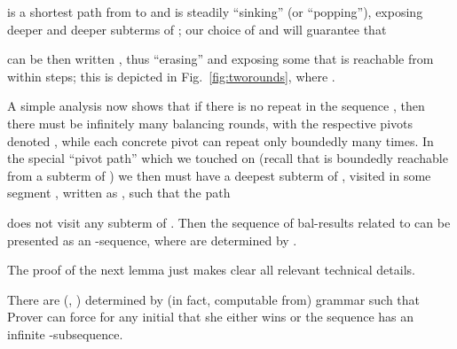 \documentclass{llncs}
\begin{document}
is a shortest path from  to  and
is steadily ``sinking'' (or
``popping''), exposing deeper and deeper subterms of ; 
our choice of  and  will guarantee that
 
can be then written , 
thus ``erasing''  
and exposing some
 that is reachable from  within  steps;
this is depicted in Fig.~\ref{fig:tworounds}, where
.

A simple analysis now shows that
if there is no repeat in the sequence 
, then
there must be infinitely many balancing rounds, with the respective 
pivots denoted 
, 
while each concrete pivot can 
repeat only boundedly many times.
In the special ``pivot path''  which we
touched on (recall 
that  is boundedly reachable from a subterm of )
we then must have a deepest subterm  of ,
visited in some segment 
, written as 
,
such that the path 

does not visit any subterm of .
Then the sequence of
bal-results related to  
can be presented as an -sequence,
where  are determined by .

The proof of the next lemma just makes clear all relevant 
technical details.

\begin{lemma}\label{lem:forcingngseq}
There are  (, )
determined by (in fact, computable from) grammar
 such that Prover can force for any initial  that
she either wins or the sequence  has an
infinite -subsequence.
\end{lemma}	
\end{document}
